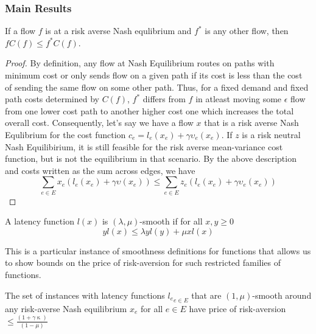 \subsubsection{Main Results}
\begin{theorem}
    If a flow $f$ is at a risk averse Nash equlibrium and $f^*$ is any other flow, then $fC(f)\leq f^*C(f)$. 
    \label{variational}
\end{theorem}

\begin{proof}
    By definition, any flow at Nash Equilibrium routes on paths with minimum cost or only sends flow on a given path if its cost is less than
    the cost of sending the same flow on some other path. Thus, for a fixed demand and fixed path costs determined by $C(f)$, $f^*$ differs from $f$ in 
    atleast moving some $\epsilon$ flow from one lower cost path to another higher cost one which increases the total overall cost. 
    Consequently, let's say we have a flow $x$ that is a risk averse Nash Equlibrium 
    for the cost function $c_e = l_e(x_e) +\gamma \upsilon_e(x_e)$. If $z$ is a risk neutral Nash Equilibirium, it is still feasible for the risk averse
    mean-variance cost function, but is not the equilibrium in that scenario. By the above description and costs written as the sum across edges, we have
    $$\sum_{e \in E}x_e(l_e(x_e) + \gamma \upsilon(x_e)) \leq \sum_{e \in E} z_e(l_e(x_e) + \gamma \upsilon_e(x_e))$$
\end{proof}

\begin{definition}
    A latency function $l(x)$ is $(\lambda, \mu)$-smooth if for all $x, y \geq 0$ $$ yl(x) \leq \lambda yl(y) + \mu x l(x)$$
    
    This is a particular instance of smoothness definitions for functions that allows us to show bounds on the price of risk-aversion for such restricted families of functions. 
\end{definition}

\begin{theorem}
    The set of instances with latency functions ${l_e}_{e \in E}$ that are $(1,\mu)$-smooth around any risk-averse Nash equilibrium $x_e$ for all $e \in E$ have price of risk-aversion
    $\leq \displaystyle \frac{(1 + \gamma \upkappa)}{(1 - \mu)}$
\end{theorem}

